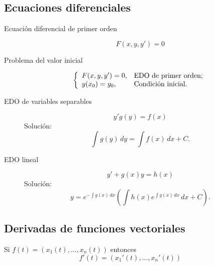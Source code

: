 \begin{multicols}{2}
\subsection*{Ecuaciones diferenciales}

\begin{tcolorbox}[hbox, title=Ecuación diferencial de primer orden]
\begin{minipage}{0.4\textwidth}
\flushleft
\begin{description}
\item[Ecuación diferencial de primer orden]
      \[
      F(x,y,y')=0
      \]
\item[Problema del valor inicial]
      \[
      \left\{
      \begin{array}{ll}
      F(x,y,y')=0, & \hbox{EDO de primer orden;} \\
      y(x_0)=y_0,  & \hbox{Condición inicial.}   \\
      \end{array}
      \right.
      \]
\end{description}
\end{minipage}
\end{tcolorbox}

\begin{tcolorbox}[hbox, title=Resolución de EDO de primer orden]
\begin{minipage}{0.4\textwidth}
\flushleft
\begin{description}
\item[EDO de variables separables]
      \[
      y'g(y)=f(x)
      \]
      Solución:
      \[
      \int g(y)\,dy = \int f(x)\,dx+C.
      \]
\item[EDO lineal]
      \[
      y'+g(x)y = h(x)
      \]
      Solución:
      \[
      y=e^{-\int g(x)\,dx}\left(\int h(x)e^{\int g(x)\,dx}\,dx+C\right).
      \]
\end{description}
\end{minipage}
\end{tcolorbox}



\subsection*{Derivadas de funciones vectoriales}

\begin{tcolorbox}[hbox, title=Derivada de una función vectorial]
\begin{minipage}{0.4\textwidth}
\flushleft
Si $f(t)=(x_1(t),\ldots, x_n(t))$ entonces
\[
f'(t)=(x_1'(t),\ldots, x_n'(t))
\]
\end{minipage}
\end{tcolorbox}


\end{multicols}
